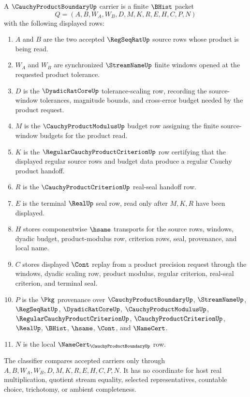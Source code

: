 \begin{definition}
\label{def:cauchy-product-boundary-carrier}
A $\CauchyProductBoundaryUp$ carrier is a finite $\BHist$ packet
$$
Q=(A,B,W_A,W_B,D,M,K,R,E,H,C,P,N)
$$
with the following displayed rows:
\begin{enumerate}
\item $A$ and $B$ are the two accepted $\RegSeqRatUp$ source rows whose product is being read.
\item $W_A$ and $W_B$ are synchronized $\StreamNameUp$ finite windows opened at the requested product tolerance.
\item $D$ is the $\DyadicRatCoreUp$ tolerance-scaling row, recording the source-window tolerances, magnitude bounds, and cross-error budget needed by the product request.
\item $M$ is the $\CauchyProductModulusUp$ budget row assigning the finite source-window budgets for the product read.
\item $K$ is the $\RegularCauchyProductCriterionUp$ row certifying that the displayed regular source rows and budget data produce a regular Cauchy product handoff.
\item $R$ is the $\CauchyProductCriterionUp$ real-seal handoff row.
\item $E$ is the terminal $\RealUp$ seal row, read only after $M,K,R$ have been displayed.
\item $H$ stores componentwise $\hsame$ transports for the source rows, windows, dyadic budget, product-modulus row, criterion rows, seal, provenance, and local name.
\item $C$ stores displayed $\Cont$ replay from a product precision request through the windows, dyadic scaling row, product modulus, regular criterion, real-seal criterion, and terminal seal.
\item $P$ is the $\Pkg$ provenance over $\CauchyProductBoundaryUp$, $\StreamNameUp$, $\RegSeqRatUp$, $\DyadicRatCoreUp$, $\CauchyProductModulusUp$, $\RegularCauchyProductCriterionUp$, $\CauchyProductCriterionUp$, $\RealUp$, $\BHist$, $\hsame$, $\Cont$, and $\NameCert$.
\item $N$ is the local $\NameCert_{\CauchyProductBoundaryUp}$ row.
\end{enumerate}
The classifier compares accepted carriers only through $A,B,W_A,W_B,D,M,K,R,E,H,C,P,N$. It has no coordinate for host real multiplication, quotient stream equality, selected representatives, countable choice, trichotomy, or ambient completeness.
\end{definition}

